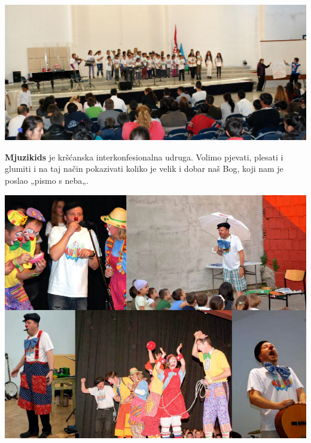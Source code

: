 \documentclass[a4paper,twoside, svgnames]{article}
\begin{document}
\newpage
\begin{center}
\includegraphics[width=\linewidth]{images/pastorlani}\\

\vfill

\textbf{Mjuzikids} je kršćanska interkonfesionalna udruga.
Volimo pjevati, plesati i glumiti i na taj način pokazivati koliko je velik
i dobar naš Bog, koji nam je poslao „pismo s neba„.

\vfill
\includegraphics[width=\linewidth]{images/klauni}\\

\end{center}
\end{document}
